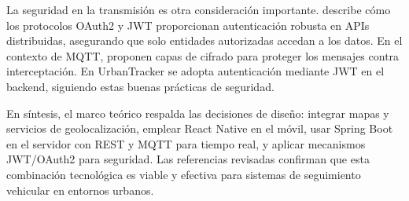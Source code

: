 La seguridad en la transmisión es otra consideración importante. \cite{shukla2025oauth} describe cómo los protocolos OAuth2 y JWT proporcionan autenticación robusta en APIs distribuidas, asegurando que solo entidades autorizadas accedan a los datos. En el contexto de MQTT, \cite{aguirre2020mqtt} proponen capas de cifrado para proteger los mensajes contra interceptación. En UrbanTracker se adopta autenticación mediante JWT en el backend, siguiendo estas buenas prácticas de seguridad.

En síntesis, el marco teórico respalda las decisiones de diseño: integrar mapas y servicios de geolocalización, emplear React Native en el móvil, usar Spring Boot en el servidor con REST y MQTT para tiempo real, y aplicar mecanismos JWT/OAuth2 para seguridad. Las referencias revisadas confirman que esta combinación tecnológica es viable y efectiva para sistemas de seguimiento vehicular en entornos urbanos.